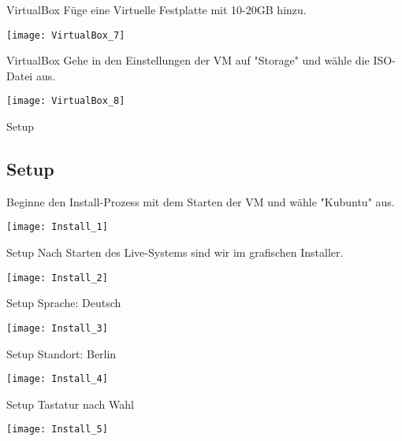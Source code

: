\begin{frame}{VirtualBox}
    Füge eine Virtuelle Festplatte mit 10-20GB hinzu.
    \begin{center}
        \texttt{[image: VirtualBox\_7]}
    \end{center}
\end{frame}

\begin{frame}{VirtualBox}
    Gehe in den Einstellungen der VM auf "Storage" und wähle die ISO-Datei aus.

    \begin{center}
        \texttt{[image: VirtualBox\_8]}
    \end{center}
\end{frame}

\begin{frame}{Setup}
    \subsection{Setup}\label{subsec:setup}
    Beginne den Install-Prozess mit dem Starten der VM und wähle "Kubuntu" aus.

    \begin{center}
        \texttt{[image: Install\_1]}
    \end{center}
\end{frame}

\begin{frame}{Setup}
    Nach Starten des Live-Systems sind wir im grafischen Installer.
    \begin{center}
        \texttt{[image: Install\_2]}
    \end{center}
\end{frame}

\begin{frame}{Setup}
    Sprache: Deutsch
    \begin{center}
        \texttt{[image: Install\_3]}
    \end{center}
\end{frame}

\begin{frame}{Setup}
    Standort: Berlin
    \begin{center}
        \texttt{[image: Install\_4]}
    \end{center}
\end{frame}

\begin{frame}{Setup}
    Tastatur nach Wahl
    \begin{center}
        \texttt{[image: Install\_5]}
    \end{center}
\end{frame}

